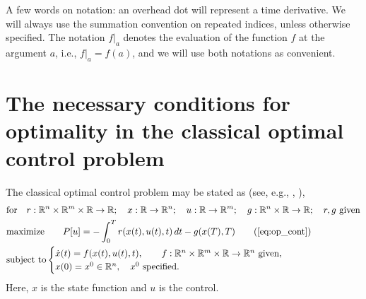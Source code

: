 \documentclass[11pt]{article}
\newcommand{\R}{\mathbb R}
\begin{document}
A few words on notation: an overhead dot will represent a time derivative. We will always use the summation convention on repeated indices, unless otherwise specified. The notation $f|_a$ denotes the evaluation of the function $f$ at the argument $a$, i.e., $f|_a = f(a)$, and we will use both notations as convenient.

\section{The necessary conditions for optimality in the classical optimal control problem}\label{sec:gen_form}
The classical optimal control problem may be stated as (see, e.g., \cite{evans1983introduction}, \cite[Sec.~9.5,9.6]{luenberger_optimization}),
\begin{subequations}\label{eq:op_cont}
\allowdisplaybreaks
    \begin{align}
        & \mbox{for} \quad r: \R^n \times \R^m \times \R \to \R; \quad x: \R \to \R^n; \quad u: \R \to \R^m; \quad g:\R^n \times \R \to \R; \quad r,g \ \mbox{given} \notag\\
        & \mbox{maximize} \qquad  P[u]  = - \int_0^T r(x(t), u(t),t) \, dt - g(x(T),T) \tag{\ref{eq:op_cont}}\\
        & \mbox{subject to} \begin{cases}
            \dot{x}(t)  = f(x(t),u(t),t), \qquad f:\R^n \times \R^m \times \R \to \R^n  \ \mbox{given},\\
            x(0) = x^0 \in \R^n, \quad x^0 \ \mbox{specified}.
        \end{cases} \notag
    \end{align}
\end{subequations}
Here, $x$ is the state function and $u$ is the control.
\end{document}

